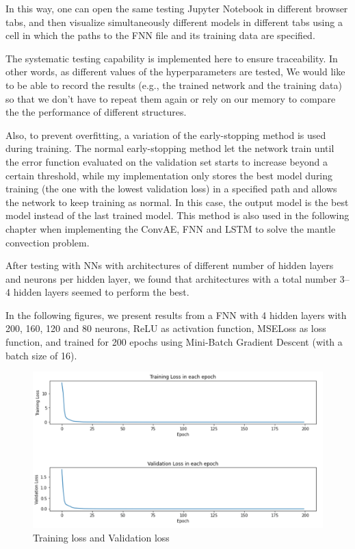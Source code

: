 In this way, one can open the same testing Jupyter Notebook in different browser tabs, and then visualize simultaneously different models in different tabs using a cell in which the paths to the FNN file and its training data are specified. 

The systematic testing capability is implemented here to ensure traceability. In other words, as different values of the hyperparameters are tested, We would like to be able to record the results (e.g., the trained network and the training data) so that we don't have to repeat them again or rely on our memory to compare the the performance of different structures.

Also, to prevent overfitting, a variation of the early-stopping method is used during training. The normal early-stopping method let the network train until the error function evaluated on the validation set starts to increase beyond a certain threshold\citep{10.1007_978-3-642-35289-8_5}, while my implementation only stores the best model during training (the one with the lowest validation loss) in a specified path and allows the network to keep training as normal. In this case, the output model is the best model instead of the last trained model. This method is also used in the following chapter when implementing the ConvAE, FNN and LSTM to solve the mantle convection problem.

After testing with NNs with architectures of different number of hidden layers and neurons per hidden layer, we found that architectures with a total number 3–4 hidden layers seemed to perform the best.

In the following figures, we present results from a FNN with 4 hidden layers with 200, 160, 120 and 80 neurons, ReLU as activation function, MSELoss as loss function, and trained for 200 epochs using Mini-Batch Gradient Descent (with a batch size of 16).

\begin{figure}[H]
    \caption{Training loss and Validation loss}
    \includegraphics[scale=0.6]{Report LaTeX/figures/geoid_images/Geoid_trainingData.png}
\end{figure}

